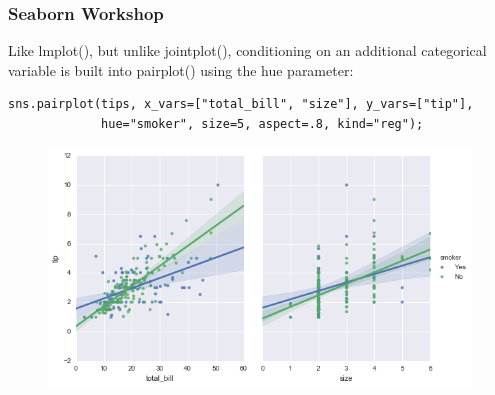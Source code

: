 \documentclass{beamer}
\begin{document}
\begin{frame}[fragile]
	\frametitle{Seaborn Workshop}
	Like lmplot(), but unlike jointplot(), conditioning on an additional categorical variable is built into pairplot() using the hue parameter:
\begin{verbatim}
sns.pairplot(tips, x_vars=["total_bill", "size"], y_vars=["tip"],
             hue="smoker", size=5, aspect=.8, kind="reg");

\end{verbatim}
\begin{figure}
	\centering
	\includegraphics[width=0.8\linewidth]{images/regression_55_0}
\end{figure}
\end{frame}
\end{document}
